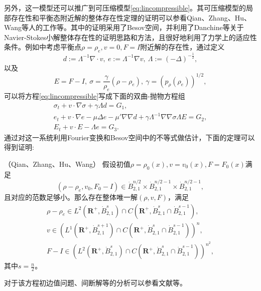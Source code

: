 另外，这一模型还可以推广到可压缩模型\eqref{eq:lincompressible}。其可压缩模型的局部存在性和平衡态附近解的整体存在性定理的证明可以参看Qian、Zhang、Hu、Wang等人的工作\cite{qian2010global,hu2011global,hu2012strong}等。其中的证明采用了Besov空间，并利用了Danchine等关于Navier-Stokes小解整体存在性的证明思路和方法\cite{danchin2000global}，且很好地利用了力学上的适应性条件。例如\cite{qian2010global}中考虑平衡点$\rho=\rho_e,v=0,F=I$附近解的存在性，通过定义
\begin{equation*}
	d:=\Lambda^{-1} \nabla \cdot v, \ e:= \Lambda^{-1} \nabla v, \ \Lambda :=(-\Delta)^{-\frac{1}{2}},
\end{equation*}
以及
\begin{equation*}
	E=F-I, \ \sigma = \frac{\gamma}{\rho_e} (\rho - \rho_e), \ \gamma = (p_{\rho}(\rho_e))^{1/2},
\end{equation*}
可以将方程\eqref{eq:lincompressible}写成下面的双曲-抛物方程组
\begin{eqnarray*}
	\sigma_t + v \cdot \nabla \sigma + \gamma \Lambda d = G_1, \\
	e_t + v \cdot \nabla e - \mu \Delta e - \mu' \nabla \nabla d + \gamma \Lambda^{-1} \nabla \nabla \sigma \Lambda E = G_2, \\
	E_t + v \cdot E - \Lambda e = G_3.
\end{eqnarray*}
通过对这一系统利用Fourier变换和Besov空间中的不等式做估计，下面的定理可以得到证明:
\begin{theorem}（Qian、Zhang\cite{qian2010global}、Hu、Wang\cite{hu2011global}）
	假设初值$\rho=\rho_0(x),v=v_0(x),F=F_0(x)$满足
	\begin{equation*}
		(\rho - \rho_e,v_0,F_0-I) \in \dot{B}_{2,1}^{n/2} \times \dot{B}_{2,1}^{n/2-1} \times \dot{B}_{2,1}^{n/2-1},
	\end{equation*}
	且对应的范数足够小。那么存在整体唯一解$(\rho,v,F)$，满足
	\begin{eqnarray*}
		\rho - \rho_e \in L^2(\mathbf{R}^+,\dot{B}_{2,1}^s) \cap C(\mathbf{R}^+,\dot{B}_{2,1}^s\cap \dot{B}_{2,1}^{s-1}),\\
		v \in \left( L^1(\mathbf{R}^+,\dot{B}_{2,1}^{s+1}) \cap C(\mathbf{R}^+,\dot{B}_{2,1}^s \cap \dot{B}_{2,1}^{s-1}) \right)^n, \\
		F- I \in \left( L^2(\mathbf{R}^+,\dot{B}_{2,1}^s) \cap C(\mathbf{R}^+,\dot{B}_{2,1}^s \cap \dot{B}_{2,1}^{s-1}) \right)^{n^2},
	\end{eqnarray*}
其中$s = \frac{n}{2}$。
\end{theorem}

对于该方程初边值问题、间断解等的分析可以参看文献\cite{qian2011initial,lin2008initial,lei2010remarks,hu2012formation,hu2015global}等。

